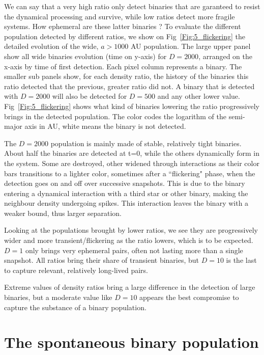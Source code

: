  We can say that a very high ratio only detect binaries that are garanteed to resist the dynamical processing and survive, while low ratios detect more fragile systems. How ephemeral are these latter binaries ? To evaluate the different population detected by different ratios, we show on Fig~\ref{Fig:5_flickering} the detailed evolution of the wide, $a>1000$ AU population. The large upper panel show all wide binaries evolution (time on y-axis) for $D=2000$, arranged on the x-axis by time of first detection. Each pixel column represents a binary. The smaller sub panels show, for each density ratio, the history of the binaries this ratio detected that the previous, greater ratio did not. A binary that is detected with $D=2000$ will also be detected for $D=500$ and any other lower value. Fig~\ref{Fig:5_flickering} shows what kind of binaries lowering the ratio progressively brings in the detected population. The color codes the logarithm of the semi-major axis in AU, white means the binary is not detected.

The $D=2000$ population is mainly made of stable, relatively tight binaries. About half the binaries are detected at t=0, while the others dynamically form in the system. Some are destroyed, other widened through interactions as their color bars transitions to a lighter color, sometimes after a ``flickering" phase, when the detection goes on and off over successive snapshots. This is due to the binary entering a dynamical interaction with a third star or other binary, making the neighbour density undergoing spikes. This interaction leaves the binary with a weaker bound, thus larger separation. 

Looking at the populations brought by lower ratios, we see they are progressively wider and more transient/flickering as the ratio lowers, which is to be expected. $D=1$ only brings very ephemeral pairs, often not lasting more than a single snapshot. All ratios bring their share of transient binaries, but $D=10$ is the last to capture relevant, relatively long-lived pairs.

Extreme values of density ratios bring a large difference in the detection of large binaries, but a moderate value like $D=10$ appears the best compromise to capture the substance of a binary population.










\section{The spontaneous binary population} 
\label{Sec:5_spontaneous}



